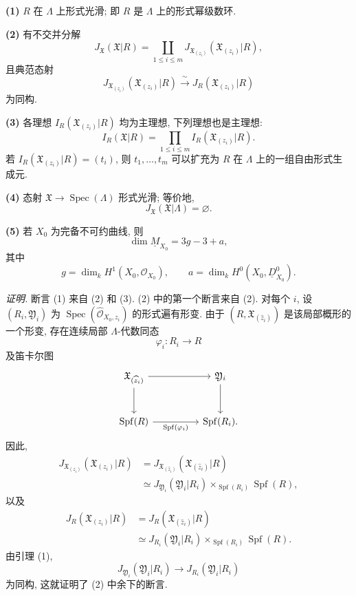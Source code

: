 \smallskip
\noindent\textbf{(1)} $R$ 在 $\Lambda$ 上形式光滑; 即 $R$ 是 $\Lambda$ 上的形式幂级数环.

\smallskip
\noindent\textbf{(2)} 有不交并分解
\[
J_{\mathfrak X}(\mathfrak X|R)
=\coprod_{1\leq i\leq m}
 J_{\mathfrak X_{(z_i)}}(\mathfrak X_{(z_i)}|R),
\]
且典范态射
\[
J_{\mathfrak X_{(z_i)}}(\mathfrak X_{(z_i)}|R)
 \xrightarrow{\ \sim\ }
J_R(\mathfrak X_{(z_i)}|R)
\]
为同构.

\smallskip
\noindent\textbf{(3)} 各理想 $I_R(\mathfrak X_{(z_i)}|R)$ 均为主理想, 下列理想也是主理想:
\[
I_R(\mathfrak X|R)
=\prod_{1\leq i\leq m}I_R(\mathfrak X_{(z_i)}|R).
\]
若 $I_R(\mathfrak X_{(z_i)}|R)=(t_i)$, 则 $t_1,\ldots,t_m$ 可以扩充为 $R$ 在 $\Lambda$ 上的一组自由形式生成元.

\smallskip
\noindent\textbf{(4)} 态射 $\mathfrak X\longrightarrow\operatorname{Spec}(\Lambda)$ 形式光滑; 等价地,
\[
J_{\mathfrak X}(\mathfrak X|\Lambda)=\varnothing.
\]


\smallskip
\noindent\textbf{(5)} 若 $X_0$ 为完备不可约曲线, 则
\[
\dim\underline M_{X_0}=3g-3+a,
\]
其中
\[
g=\dim_kH^1(X_0,\mathcal O_{X_0}),
\qquad
a=\dim_kH^0(X_0,\underline D^0_{X_0}).
\]

\smallskip
\noindent\textit{证明.}
断言 (1) 来自 (2) 和 (3). (2) 中的第一个断言来自 (2). 对每个 $i$, 设 $(R_i,\mathfrak Y_i)$ 为 $\operatorname{Spec}(\widehat{\mathcal O}_{X_0,z_i})$ 的形式遍有形变. 由于 $(R,\mathfrak X_{(\widehat z_i)})$ 是该局部概形的一个形变, 存在连续局部 $\Lambda$-代数同态
\[
\varphi_i:R_i\longrightarrow R
\]
及笛卡尔图
\[
\begin{tikzcd}[column sep=huge,row sep=large]
\mathfrak X_{(\widehat z_i)}
  \arrow[r] \arrow[d]
& \mathfrak Y_i \arrow[d]\\
\operatorname{Spf}(R)
  \arrow[r,"{\operatorname{Spf}(\varphi_i)}"']
& \operatorname{Spf}(R_i).
\end{tikzcd}
\]
因此,
\[
\begin{aligned}
J_{\mathfrak X_{(z_i)}}(\mathfrak X_{(z_i)}|R)
&=J_{\mathfrak X_{(\widehat z_i)}}
   (\mathfrak X_{(\widehat z_i)}|R)\\
&\simeq
J_{\mathfrak Y_i}(\mathfrak Y_i|R_i)
 \times_{\operatorname{Spf}(R_i)}\operatorname{Spf}(R),
\end{aligned}
\]
以及
\[
\begin{aligned}
J_R(\mathfrak X_{(z_i)}|R)
&=J_R(\mathfrak X_{(\widehat z_i)}|R)\\
&\simeq
J_{R_i}(\mathfrak Y_i|R_i)
 \times_{\operatorname{Spf}(R_i)}\operatorname{Spf}(R).
\end{aligned}
\]
由引理 (1),
\[
J_{\mathfrak Y_i}(\mathfrak Y_i|R_i)
 \longrightarrow J_{R_i}(\mathfrak Y_i|R_i)
\]
为同构, 这就证明了 (2) 中余下的断言.

